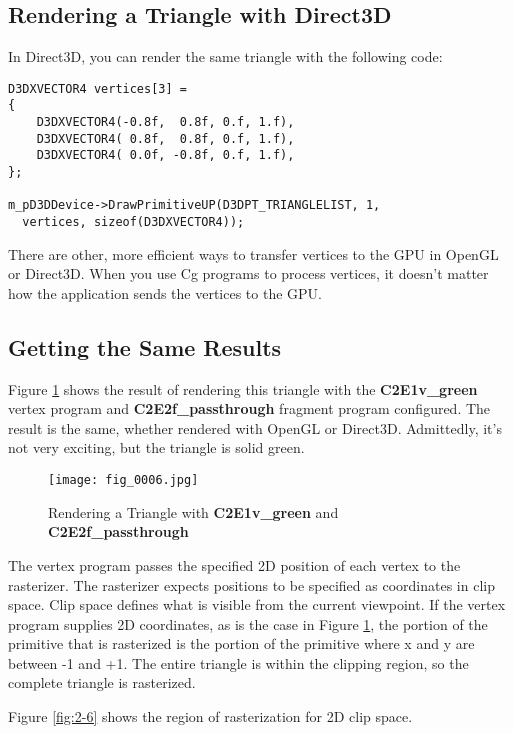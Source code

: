 \documentclass[../main.tex]{subfiles}
\begin{document}
\subsection{Rendering a Triangle with Direct3D}

In Direct3D, you can render the same triangle with the following code:

\FloatBarrier
\begin{lstlisting}
D3DXVECTOR4 vertices[3] =
{
    D3DXVECTOR4(-0.8f,  0.8f, 0.f, 1.f),
    D3DXVECTOR4( 0.8f,  0.8f, 0.f, 1.f),
    D3DXVECTOR4( 0.0f, -0.8f, 0.f, 1.f),
};

m_pD3DDevice->DrawPrimitiveUP(D3DPT_TRIANGLELIST, 1,
  vertices, sizeof(D3DXVECTOR4));
\end{lstlisting}
\FloatBarrier

There are other, more efficient ways to transfer vertices to the GPU in OpenGL or Direct3D. When you use Cg programs to process vertices, it doesn't matter how the application sends the vertices to the GPU.

\subsection{Getting the Same Results}

Figure \ref{fig:2-5} shows the result of rendering this triangle with the \textbf{C2E1v_green} vertex program and \textbf{C2E2f_passthrough} fragment program configured. The result is the same, whether rendered with OpenGL or Direct3D. Admittedly, it's not very exciting, but the triangle is solid green.

\begin{figure}
    \centering
    \texttt{[image: fig\_0006.jpg]}
    \caption{Rendering a Triangle with \textbf{C2E1v_green} and \textbf{C2E2f_passthrough}}
    \label{fig:2-5}
\end{figure}

The vertex program passes the specified 2D position of each vertex to the rasterizer. The rasterizer expects positions to be specified as coordinates in clip space. Clip space defines what is visible from the current viewpoint. If the vertex program supplies 2D coordinates, as is the case in Figure \ref{fig:2-5}, the portion of the primitive that is rasterized is the portion of the primitive where x and y are between -1 and +1. The entire triangle is within the clipping region, so the complete triangle is rasterized.

Figure \ref{fig:2-6} shows the region of rasterization for 2D clip space.
\end{document}
